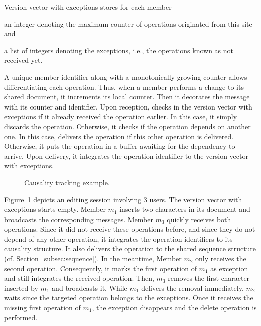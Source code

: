 \begin{asparadesc}
\item [Version vector with exceptions] stores for each member
  \begin{inparaenum}[(i)]
  \item an integer denoting the maximum counter of operations originated from
    this site and
  \item a list of integers denoting the exceptions, i.e., the operations known
    as not received yet.
  \end{inparaenum}
  
  A unique member identifier along with a monotonically growing counter allows
  differentiating each operation. Thus, when a member performs a change to its
  shared document, it increments its local counter. Then it decorates the
  message with its counter and identifier. Upon reception, \CRATE checks in the
  version vector with exceptions if it already received the operation
  earlier. In this case, it simply discards the operation.  Otherwise, it checks
  if the operation depends on another one. In this case, \CRATE delivers the
  operation if this other operation is delivered. Otherwise, it puts the
  operation in a buffer awaiting for the dependency to arrive. Upon delivery, it
  integrates the operation identifier to the version vector with exceptions.

  \begin{figure}
    
    \caption{\label{fig:timeline} Causality tracking example.}
  \end{figure}

  Figure~\ref{fig:timeline} depicts an editing session involving 3 users. The
  version vector with exceptions starts empty. Member $m_1$ inserts two
  characters in its document and broadcasts the corresponding messages. Member
  $m_3$ quickly receives both operations. Since it did not receive these
  operations before, and since they do not depend of any other operation, it
  integrates the operation identifiers to its causality structure. It also
  delivers the operation to the shared sequence structure
  (cf. Section~\ref{subsec:sequence}). In the meantime, Member $m_2$ only
  receives the second operation. Consequently, it marks the first operation of
  $m_1$ as exception and still integrates the received operation. Then, $m_3$
  removes the first character inserted by $m_1$ and broadcasts it. While $m_1$
  delivers the removal immediately, $m_2$ waits since the targeted operation
  belongs to the exceptions. Once it receives the missing first operation of
  $m_1$, the exception disappears and the delete operation is performed.


\end{asparadesc}
